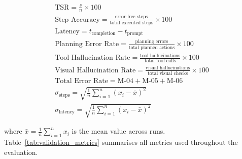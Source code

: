 \begin{gather}
    \text{TSR} = \frac{s}{n} \times 100 \label{eq:M-01} \\[6pt]
    \text{Step Accuracy} = \frac{\text{error-free steps}}{\text{total executed steps}} \times 100 \label{eq:M-02} \\[6pt]
    \text{Latency} = t_{\text{completion}} - t_{\text{prompt}} \label{eq:M-03} \\[6pt]
    \text{Planning Error Rate} = \frac{\text{planning errors}}{\text{total planned actions}} \times 100 \label{eq:M-04} \\[6pt]
    \text{Tool Hallucination Rate} = \frac{\text{tool hallucinations}}{\text{total tool calls}} \times 100 \label{eq:M-05} \\[6pt]
    \text{Visual Hallucination Rate} = \frac{\text{visual hallucinations}}{\text{total visual checks}} \times 100 \label{eq:M-06} \\[6pt]
    \text{Total Error Rate} = \text{M-04} + \text{M-05} + \text{M-06} \label{eq:M-07} \\[6pt]
    \sigma_{\text{steps}} = \sqrt{\frac{1}{n}\sum_{i=1}^{n}(x_i - \bar{x})^2} \label{eq:M-08} \\[6pt]
    \sigma_{\text{latency}} = \sqrt{\frac{1}{n}\sum_{i=1}^{n}(x_i - \bar{x})^2} \label{eq:M-09}
\end{gather}

\noindent where $\bar{x} = \frac{1}{n}\sum_{i=1}^{n} x_i$ is the mean value across runs. Table~\ref{tab:validation_metrics} summarises all metrics used throughout the evaluation.



